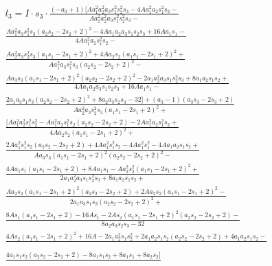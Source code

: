 \documentclass[a4paper,12pt]{article}
\begin{document}
\begin{align*}
    &l_3=I\cdot s_3\cdot\frac{(-a_3 + 1)[Aa_1^2a_2^2a_3s_1^2s_2^2s_3 - 4Aa_1^2a_2s_1^2s_2 -}{Aa_1^2a_2^2a_3s_1^2s_2^2s_3 -}\\
    &\frac{Aa_1^2a_3s_1^2s_3(a_2s_2 - 2s_2 + 2)^2 - 4Aa_1a_2a_3s_1s_2s_3 + 16Aa_1s_1 -}{ 4Aa_1^2a_2s_1^2s_2 -}\\
    &\frac{Aa_2^2a_3s_2^2s_3(a_1s_1 - 2s_1 + 2)^2 + 4Aa_2s_2(a_1s_1 - 2s_1 + 2)^2 +}{Aa_1^2a_3s_1^2s_3(a_2s_2 - 2s_2 + 2)^2 -}\\
    &\frac{Aa_3s_3(a_1s_1 - 2s_1 + 2)^2(a_2s_2 - 2s_2 + 2)^2 - 2a_1a_2^2a_3s_1s_2^2s_3 + 8a_1a_2s_1s_2 +}{4Aa_1a_2a_3s_1s_2s_3 + 16Aa_1s_1 -}\\
    &\frac{2a_1a_3s_1s_3(a_2s_2 - 2s_2 + 2)^2 + 8a_2a_3s_2s_3 - 32] + (a_3 - 1)(a_3s_3 - 2s_3 + 2)}{Aa_2^2a_3s_2^2s_3(a_1s_1 - 2s_1 + 2)^2 +}\\
    &\frac{[Aa_1^2a_2^2s_1^2s_2^2 - Aa_1^2a_2s_1^2s_2(a_2s_2 - 2s_2 + 2) - 2Aa_1^2a_2s_1^2s_2 +}{4Aa_2s_2(a_1s_1 - 2s_1 + 2)^2 +}\\
    &\frac{2Aa_1^2s_1^2s_2(a_2s_2 - 2s_2 + 2) + 4Aa_1^2s_1^2s_2 - 4Aa_1^2s_1^2 - 4Aa_1a_2s_1s_2 +}{Aa_3s_3(a_1s_1 - 2s_1 + 2)^2(a_2s_2 - 2s_2 + 2)^2 -}\\
    &\frac{4Aa_1s_1(a_1s_1 - 2s_1 + 2) + 8Aa_1s_1 - Aa_2^2s_2^2(a_1s_1 - 2s_1 + 2)^2 +}{ 2a_1a_2^2a_3s_1s_2^2s_3 + 8a_1a_2s_1s_2 +}\\
    &\frac{Aa_2s_2(a_1s_1 - 2s_1 + 2)^2(a_2s_2 - 2s_2 + 2) + 2Aa_2s_2(a_1s_1 - 2s_1 + 2)^2 - }{2a_1a_3s_1s_3(a_2s_2 - 2s_2 + 2)^2 +}\\
    &\frac{8As_1(a_1s_1 - 2s_1 + 2) -16As_1 - 2As_2(a_1s_1 - 2s_1 + 2)^2(a_2s_2 - 2s_2 + 2) - }{8a_2a_3s_2s_3 - 32}\\
    &\frac{4As_2(a_1s_1 - 2s_1 + 2)^2 +16A - 2a_1a_2^2s_1s_2^2 + 2a_1a_2s_1s_2(a_2s_2 - 2s_2 + 2) + 4a_1a_2s_1s_2 -}{}\\
    &\frac{4a_1s_1s_2(a_2s_2 - 2s_2 + 2) - 8a_1s_1s_2 + 8a_1s_1 + 8a_2s_2]}{}\\
\end{align*}
\end{document}
